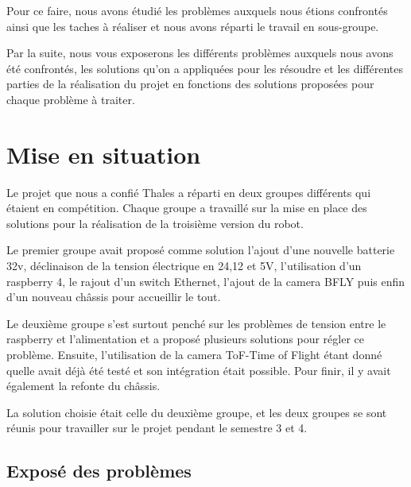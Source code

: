 \documentclass{PackagerQualityN}
\begin{document}
Pour ce faire, nous avons étudié les problèmes auxquels nous étions confrontés ainsi que les taches à réaliser et nous avons réparti le travail en sous-groupe.

Par la suite, nous vous exposerons les différents problèmes auxquels nous avons été confrontés, les solutions qu’on a appliquées pour les résoudre et les différentes parties de la réalisation du projet en fonctions des solutions proposées pour chaque problème à traiter. 





\newp       %
\paragraph{}

\section{Mise en situation}

Le projet que nous a confié Thales a réparti en deux groupes différents qui étaient en compétition. Chaque groupe a travaillé sur la mise en place des solutions pour la réalisation de la troisième version du robot.

Le premier groupe avait proposé comme solution l’ajout d’une nouvelle batterie 32v, déclinaison de la tension électrique en 24,12 et 5V, l’utilisation d’un raspberry 4, le rajout d’un switch Ethernet, l'ajout de la camera BFLY puis enfin d’un nouveau châssis pour accueillir le tout.

Le deuxième groupe s’est surtout penché sur les problèmes de tension entre le raspberry et l’alimentation et a proposé plusieurs solutions pour régler ce problème. Ensuite, l’utilisation de la camera ToF-Time of Flight étant donné quelle avait déjà été testé et son intégration était possible. Pour finir, il y avait également la refonte du châssis. 

La solution choisie était celle du deuxième groupe, et les deux groupes se sont réunis pour travailler sur le projet pendant le semestre 3 et 4.

\subsection{Exposé des problèmes}
\end{document}
